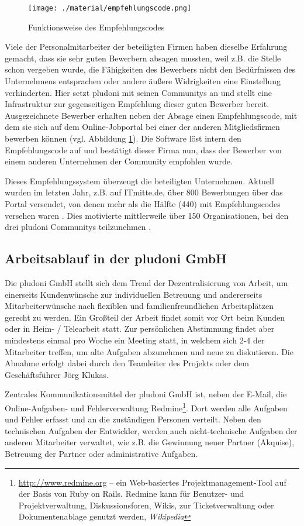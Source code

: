 \begin{figure}[htbp]
 \centering
 \texttt{[image: ./material/empfehlungscode.png]}
 \caption{Funktionsweise des Empfehlungscodes}
 \label{fig:empfehlung}
\end{figure}
Viele der Personalmitarbeiter der beteiligten Firmen haben dieselbe Erfahrung gemacht, dass sie sehr guten Bewerbern absagen mussten, weil z.B. die Stelle schon vergeben wurde, die Fähigkeiten des Bewerbers nicht den Bedürfnissen des Unternehmens entsprachen oder andere äußere Widrigkeiten eine Einstellung verhinderten. Hier setzt pludoni mit seinen Communitys an und stellt eine Infrastruktur zur gegenseitigen Empfehlung dieser guten Bewerber bereit.  Ausgezeichnete Bewerber erhalten neben der Absage einen Empfehlungscode, mit dem sie sich auf dem Online-Jobportal bei einer der anderen Mitgliedsfirmen bewerben können (vgl. Abbildung \ref{fig:empfehlung}). Die Software löst intern den Empfehlungscode auf und bestätigt dieser Firma nun, dass der Bewerber von einem anderen Unternehmen der Community empfohlen wurde.

Dieses Empfehlungssystem überzeugt die beteiligten Unternehmen. Aktuell wurden im letzten Jahr, z.B. auf ITmitte.de, über 800 Bewerbungen über das Portal versendet, von denen mehr als die Hälfte (440) mit Empfehlungscodes versehen waren \citep{joerg_klukas_startseite_2011}. Dies motivierte mittlerweile über 150 Organisationen, bei den drei pludoni Communitys teilzunehmen \citep{joerg_klukas_referenzen_2011}.

\subsection{Arbeitsablauf in der pludoni GmbH}
\label{sec:arbeitsablauf}
Die pludoni GmbH stellt sich dem Trend der Dezentralisierung von Arbeit, um einerseits Kundenwünsche zur individuellen Betreuung und andererseits Mitarbeiterwünsche nach flexiblen und familienfreundlichen Arbeitsplätzen gerecht zu werden. Ein Großteil der Arbeit findet somit vor Ort beim Kunden oder in Heim- / Telearbeit statt.
Zur persönlichen Abstimmung findet aber mindestens einmal pro Woche ein Meeting statt, in welchem sich 2-4 der Mitarbeiter treffen, um alte Aufgaben abzunehmen und neue zu diskutieren. Die Abnahme erfolgt dabei durch den Teamleiter des Projekts oder dem Geschäftsführer Jörg Klukas.

Zentrales Kommunikationsmittel der pludoni GmbH ist, neben der E-Mail, die Online\hyp{}Aufgaben\hyp{} und Fehlerverwaltung Redmine\footnote{\url{http://www.redmine.org} -- ein Web-basiertes Projektmanagement-Tool auf der Basis von Ruby on Rails. Redmine kann für Benutzer- und Projektverwaltung, Diskussionsforen, Wikis, zur Ticketverwaltung oder Dokumentenablage genutzt werden, \textit{Wikipedia}}. Dort werden alle Aufgaben und Fehler erfasst und an die zuständigen Personen verteilt.
Neben den technischen Aufgaben der Entwickler, werden auch nicht-technische Aufgaben der anderen Mitarbeiter verwaltet, wie z.B. die Gewinnung neuer Partner (Akquise), Betreuung der Partner oder administrative Aufgaben.

